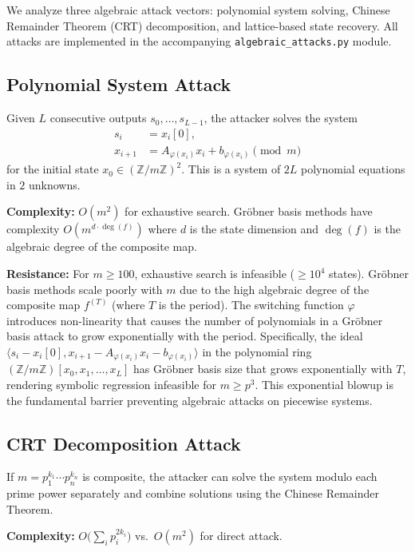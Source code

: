 \documentclass[11pt]{article}
\theoremstyle{plain}
\theoremstyle{definition}
\newcommand{\Z}{\mathbb{Z}}
\begin{document}
We analyze three algebraic attack vectors: polynomial system solving, Chinese Remainder Theorem (CRT) decomposition, and lattice-based state recovery. All attacks are implemented in the accompanying \texttt{algebraic\_attacks.py} module.

\subsection{Polynomial System Attack}

Given $L$ consecutive outputs $s_0, \ldots, s_{L-1}$, the attacker solves the system
\begin{align}
  s_i &= x_i[0], \\
  x_{i+1} &= A_{\varphi(x_i)} x_i + b_{\varphi(x_i)} \pmod{m}
\end{align}
for the initial state $x_0 \in (\Z/m\Z)^2$. This is a system of $2L$ polynomial equations in $2$ unknowns.

\textbf{Complexity:} $O(m^2)$ for exhaustive search. Gr\"obner basis methods have complexity $O(m^{d \cdot \deg(f)})$ where $d$ is the state dimension and $\deg(f)$ is the algebraic degree of the composite map.

\textbf{Resistance:} For $m \geq 100$, exhaustive search is infeasible ($\geq 10^4$ states). Gr\"obner basis methods scale poorly with $m$ due to the high algebraic degree of the composite map $f^{(T)}$ (where $T$ is the period). The switching function $\varphi$ introduces non-linearity that causes the number of polynomials in a Gr\"obner basis attack to grow exponentially with the period. Specifically, the ideal $\langle s_i - x_i[0], x_{i+1} - A_{\varphi(x_i)} x_i - b_{\varphi(x_i)} \rangle$ in the polynomial ring $(\mathbb{Z}/m\mathbb{Z})[x_0, x_1, \ldots, x_L]$ has Gr\"obner basis size that grows exponentially with $T$, rendering symbolic regression infeasible for $m \geq p^3$. This exponential blowup is the fundamental barrier preventing algebraic attacks on piecewise systems.

\subsection{CRT Decomposition Attack}

If $m = p_1^{k_1} \cdots p_n^{k_n}$ is composite, the attacker can solve the system modulo each prime power separately and combine solutions using the Chinese Remainder Theorem.

\textbf{Complexity:} $O\bigl(\sum_i p_i^{2k_i}\bigr)$ vs.\ $O(m^2)$ for direct attack.
\end{document}
